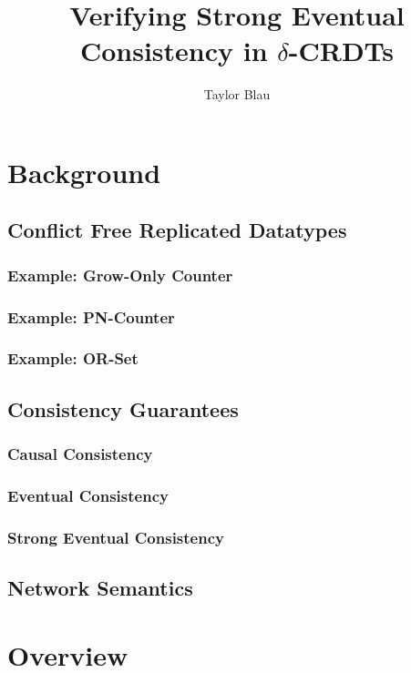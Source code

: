 \documentclass{thesis}
\title{Verifying Strong Eventual Consistency in $\delta$-CRDTs}
\author{Taylor Blau}
\begin{document}

  

  \frontmatter
  \cleardoublepage

  
  
  

  \tableofcontents

  \mainmatter
  

  \chapter{Background}
  \section{Conflict Free Replicated Datatypes}
  \subsection{Example: Grow-Only Counter}
  \subsection{Example: PN-Counter}
  \subsection{Example: OR-Set}
  \section{Consistency Guarantees}
  \subsection{Causal Consistency}
  \subsection{Eventual Consistency}
  \subsection{Strong Eventual Consistency}
  \section{Network Semantics}

  \chapter{Overview}
\end{document}
